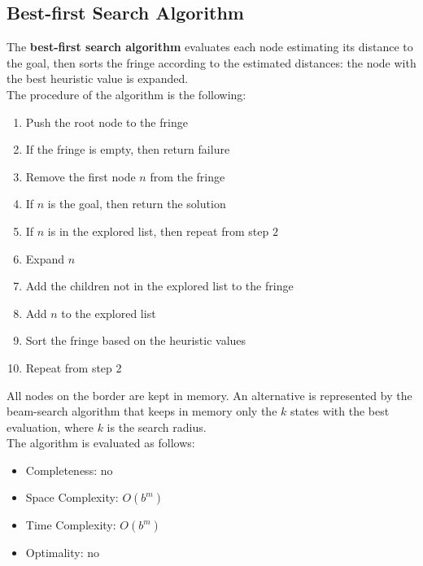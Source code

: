 \documentclass{article}
\begin{document}
\subsection{Best-first Search Algorithm}
The \textbf{best-first search algorithm} evaluates each node estimating its distance to the goal, then sorts the fringe according to the estimated distances: the node with the best heuristic value is expanded. \\
The procedure of the algorithm is the following:
\begin{enumerate}
    \item Push the root node to the fringe
    \item If the fringe is empty, then return failure
    \item Remove the first node $n$ from the fringe
    \item If $n$ is the goal, then return the solution
    \item If $n$ is in the explored list, then repeat from step $2$
    \item Expand $n$
    \item Add the children not in the explored list to the fringe
    \item Add $n$ to the explored list
    \item Sort the fringe based on the heuristic values
    \item Repeat from step 2
\end{enumerate}
All nodes on the border are kept in memory. An alternative is represented by the beam-search algorithm that keeps in memory only the $k$ states with the best evaluation, where $k$ is the search radius. \\
The algorithm is evaluated as follows:
\begin{itemize}
    \item Completeness: no
    \item Space Complexity: $O(b^{m})$
    \item Time Complexity: $O(b^{m})$
    \item Optimality: no
\end{itemize}
\newpage
\end{document}
